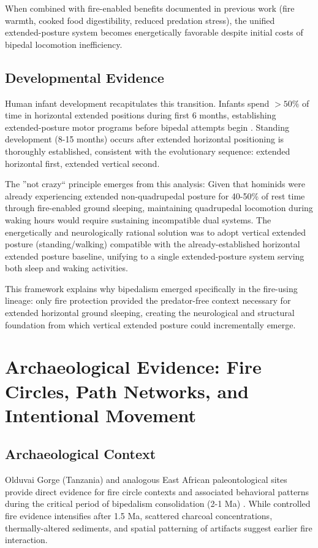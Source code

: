 \documentclass[12pt,a4paper]{article}
\begin{document}
When combined with fire-enabled benefits documented in previous work (fire warmth, cooked food digestibility, reduced predation stress), the unified extended-posture system becomes energetically favorable despite initial costs of bipedal locomotion inefficiency.

\subsection{Developmental Evidence}

Human infant development recapitulates this transition. Infants spend $>50\%$ of time in horizontal extended positions during first 6 months, establishing extended-posture motor programs before bipedal attempts begin \citep{adolph2000specificity}. Standing development (8-15 months) occurs after extended horizontal positioning is thoroughly established, consistent with the evolutionary sequence: extended horizontal first, extended vertical second.

The ''not crazy`` principle emerges from this analysis: Given that hominids were already experiencing extended non-quadrupedal posture for 40-50\% of rest time through fire-enabled ground sleeping, maintaining quadrupedal locomotion during waking hours would require sustaining incompatible dual systems. The energetically and neurologically rational solution was to adopt vertical extended posture (standing/walking) compatible with the already-established horizontal extended posture baseline, unifying to a single extended-posture system serving both sleep and waking activities.

This framework explains why bipedalism emerged specifically in the fire-using lineage: only fire protection provided the predator-free context necessary for extended horizontal ground sleeping, creating the neurological and structural foundation from which vertical extended posture could incrementally emerge.

\section{Archaeological Evidence: Fire Circles, Path Networks, and Intentional Movement}
\subsection{Archaeological Context}

Olduvai Gorge (Tanzania) and analogous East African paleontological sites provide direct evidence for fire circle contexts and associated behavioral patterns during the critical period of bipedalism consolidation (2-1 Ma) \citep{gowlett2016earliest,berna2012microstratigraphic}. While controlled fire evidence intensifies after 1.5 Ma, scattered charcoal concentrations, thermally-altered sediments, and spatial patterning of artifacts suggest earlier fire interaction.
\end{document}
